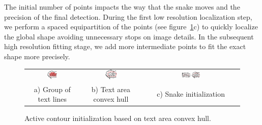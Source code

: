 The initial number of points impacts the way that the snake moves and the precision of the final detection.
During the first low resolution localization step, we perform a spaced equipartition of the points (see figure~\ref{fig:se:se:paragraphs}c) to quickly localize the global shape avoiding unnecessary stops on image details.
In the subsequent high resolution fitting stage, we add more intermediate points to fit the exact shape more precisely.

	\begin{figure}[!ht]%
	\begin{center}
	  \begin{tabular}{ccc}
	  \includegraphics[trim= 0mm 0mm 0mm 0mm, clip, width=0.20\textwidth]{group_lines.png}&
	  \includegraphics[trim= 0mm 0mm 0mm 0mm, clip, width=0.20\textwidth]{convex_hull.png}&
	  \includegraphics[trim= 48mm 0mm 0mm 0mm, clip, width=0.20\textwidth]{snake_init.png} \\ 
	  \footnotesize a) Group of text lines	& \footnotesize b) Text area convex hull 	& \footnotesize c) Snake initialization 
	  \end{tabular}
	\caption{Active contour initialization based on text area convex hull.}
		\label{fig:se:se:paragraphs}
	\end{center}
	\end{figure}	



